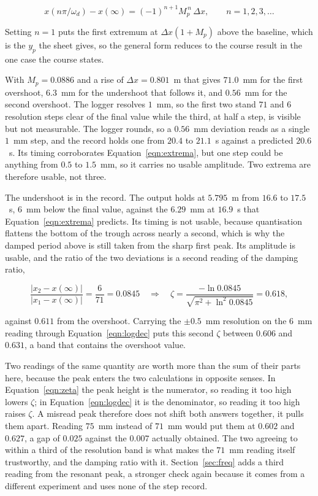 \begin{equation}\label{eqn:extrema}
    x(n\pi/\omega_d) - x(\infty) = (-1)^{n+1} M_p^{\,n} \, \Delta x,
    \qquad n = 1, 2, 3, \dots
\end{equation}

Setting $n = 1$ puts the first extremum at $\Delta x(1 + M_p)$ above the baseline, which is the
$y_p$ the sheet gives, so the general form reduces to the course result in the one case the
course states.

With $M_p = 0.0886$ and a rise of $\Delta x = 0.801$~m that gives $71.0$~mm for the first
overshoot, $6.3$~mm for the undershoot that follows it, and $0.56$~mm for the second
overshoot. The logger resolves $1$~mm, so the first two stand $71$ and $6$ resolution steps
clear of the final value while the third, at half a step, is visible but not measurable. The
logger rounds, so a $0.56$~mm deviation reads as a single $1$~mm step, and the record holds
one from $20.4$ to $21.1$~s against a predicted $20.6$~s. Its timing corroborates
Equation~\ref{eqn:extrema}, but one step could be anything from $0.5$ to $1.5$~mm, so it
carries no usable amplitude. Two extrema are therefore usable, not three.

The undershoot is in the record. The output holds at $5.795$~m from $16.6$ to $17.5$~s,
$6$~mm below the final value, against the $6.29$~mm at $16.9$~s that
Equation~\ref{eqn:extrema} predicts. Its timing is not usable, because quantisation flattens
the bottom of the trough across nearly a second, which is why the damped period above is
still taken from the sharp first peak. Its amplitude is usable, and the ratio of the two
deviations is a second reading of the damping ratio,

\begin{equation}\label{eqn:logdec}
    \frac{|x_2 - x(\infty)|}{|x_1 - x(\infty)|} = \frac{6}{71} = 0.0845
    \quad\Longrightarrow\quad
    \zeta = \frac{-\ln 0.0845}{\sqrt{\pi^2 + \ln^2 0.0845}} = 0.618,
\end{equation}

against $0.611$ from the overshoot. Carrying the $\pm 0.5$~mm resolution on the $6$~mm
reading through Equation~\ref{eqn:logdec} puts this second $\zeta$ between $0.606$ and
$0.631$, a band that contains the overshoot value.

Two readings of the same quantity are worth more than the sum of their parts here, because the
peak enters the two calculations in opposite senses. In Equation~\ref{eqn:zeta} the peak height
is the numerator, so reading it too high lowers $\zeta$; in Equation~\ref{eqn:logdec} it is the
denominator, so reading it too high raises $\zeta$. A misread peak therefore does not shift
both answers together, it pulls them apart. Reading $75$~mm instead of $71$~mm would put them
at $0.602$ and $0.627$, a gap of $0.025$ against the $0.007$ actually obtained. The two
agreeing to within a third of the resolution band is what makes the $71$~mm reading itself
trustworthy, and the damping ratio with it. Section~\ref{sec:freq} adds a third reading from
the resonant peak, a stronger check again because it comes from a different experiment and uses
none of the step record.

